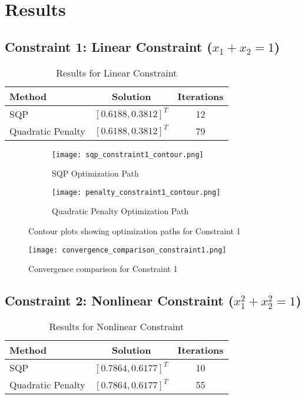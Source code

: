\documentclass[11pt,a4paper]{article}
\begin{document}
\section{Results}

\subsection{Constraint 1: Linear Constraint ($x_1 + x_2 = 1$)}

\begin{table}[H]
\centering
\caption{Results for Linear Constraint}
\begin{tabular}{@{}lcc@{}}
\toprule
Method & Solution & Iterations \\
\midrule
SQP & $[0.6188, 0.3812]^T$ & 12 \\
Quadratic Penalty & $[0.6188, 0.3812]^T$ & 79 \\
\bottomrule
\end{tabular}
\end{table}

\begin{figure}[H]
\centering
\begin{subfigure}{0.48\textwidth}
    \centering
    \texttt{[image: sqp\_constraint1\_contour.png]}
    \caption{SQP Optimization Path}
\end{subfigure}
\hfill
\begin{subfigure}{0.48\textwidth}
    \centering
    \texttt{[image: penalty\_constraint1\_contour.png]}
    \caption{Quadratic Penalty Optimization Path}
\end{subfigure}
\caption{Contour plots showing optimization paths for Constraint 1}
\end{figure}

\begin{figure}[H]
\centering
\texttt{[image: convergence\_comparison\_constraint1.png]}
\caption{Convergence comparison for Constraint 1}
\end{figure}

\subsection{Constraint 2: Nonlinear Constraint ($x_1^2 + x_2^2 = 1$)}

\begin{table}[H]
\centering
\caption{Results for Nonlinear Constraint}
\begin{tabular}{@{}lcc@{}}
\toprule
Method & Solution & Iterations \\
\midrule
SQP & $[0.7864, 0.6177]^T$ & 10 \\
Quadratic Penalty & $[0.7864, 0.6177]^T$ & 55 \\
\bottomrule
\end{tabular}
\end{table}
\end{document}
